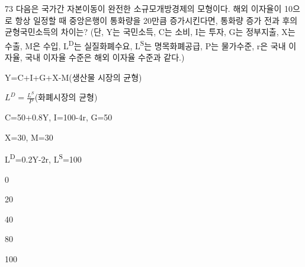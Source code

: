 \begin{question}{73}
다음은 국가간 자본이동이 완전한 소규모개방경제의 모형이다. 해외 이자율이 10으로 항상 일정할 때 중앙은행이 통화량을 20만큼 증가시킨다면, 통화량 증가 전과 후의 균형국민소득의 차이는? (단, Y는 국민소득, C는 소비, I는 투자, G는 정부지출, X는 수출, M은 수입, L\textsuperscript{D}는 실질화폐수요, L\textsuperscript{S}는 명목화폐공급, P는 물가수준, r은 국내 이자율, 국내 이자율 수준은 해외 이자율 수준과 같다.)
\begin{framedtext}
Y=C+I+G+X-M(생산물 시장의 균형) \par
$L^{ D } = \frac{ L^{ S } } { P }$(화폐시장의 균형) \par
C=50+0.8Y, I=100-4r, G=50 \par
X=30, M=30 \par
L\textsuperscript{D}=0.2Y-2r, L\textsuperscript{S}=100
\end{framedtext}
\begin{choices}
  \item 0
  \item 20
  \item 40
  \item 80
  \item 100
\end{choices}
\end{question}
